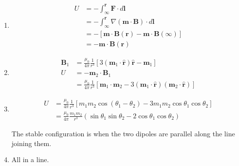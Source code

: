 \documentclass{article}
\renewcommand{\vec}[1]{\boldsymbol{\mathbf{#1}}}
\newcommand{\uvec}[1]{\hat{\vec{#1}}}
\begin{document}
\begin{enumerate}
  \item

        \begin{align*}
          U & = -\int_\infty^{\vec{r}} \vec{F} \cdot d \vec{l}                        \\
            & = -\int_\infty^{\vec{r}} \nabla (\vec{m} \cdot \vec{B}) \cdot d \vec{l} \\
            & = -[\vec{m} \cdot \vec{B}(\vec{r}) - \vec{m} \cdot \vec{B}(\infty)]     \\
            & = -\vec{m} \cdot \vec{B}(\vec{r})
        \end{align*}

  \item

        \begin{align*}
          \vec{B}_1 & = \frac{\mu_0}{4 \pi} \frac{1}{r^3} [3 (\vec{m}_1 \cdot \uvec{r}) \uvec{r} - \vec{m}_1]                                   \\
          U         & = -\vec{m}_2 \cdot \vec{B}_1                                                                                              \\
                    & = \frac{\mu_0}{4 \pi} \frac{1}{r^3} [\vec{m}_1 \cdot \vec{m}_2 - 3 (\vec{m}_1 \cdot \uvec{r}) (\vec{m}_2 \cdot \uvec{r})]
        \end{align*}

  \item

        \begin{align*}
          U & = \frac{\mu_0}{4 \pi} \frac{1}{r^3} [m_1 m_2 \cos (\theta_1 - \theta_2) - 3 m_1 m_2 \cos \theta_1 \cos \theta_2] \\
            & = \frac{\mu_0}{4 \pi} \frac{m_1 m_2}{r^3} (\sin \theta_1 \sin \theta_2 - 2 \cos \theta_1 \cos \theta_2)
        \end{align*}

        The stable configuration is when the two dipoles are parallel along the line joining them.

  \item All in a line.
\end{enumerate}

\setcounter{subsection}{22}
\subsection{}
\end{document}
